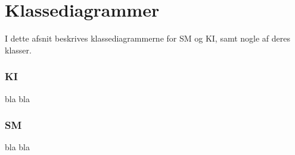 \chapter{Klassediagrammer}
I dette afsnit beskrives klassediagrammerne for SM og KI, samt nogle af deres klasser.
\subsection{KI}
bla bla
\subsection{SM}
bla bla
